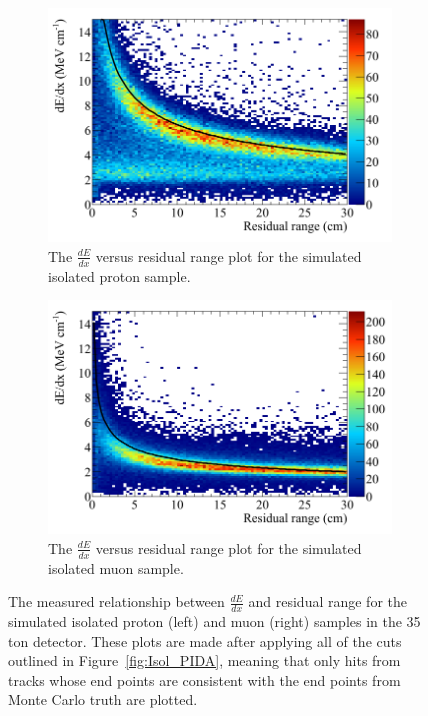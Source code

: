 \begin{figure}
  \centering
  \begin{subfigure}{0.48\textwidth}
        \centering
        \includegraphics[width=\textwidth]{IsolatedProtons_500V_Dec16_Proton_dEdx}
        \caption{The $\frac{dE}{dx}$ versus residual range plot for the simulated isolated proton sample.}
        \label{fig:Isol_dEdx_Proton}
  \end{subfigure}%
  \hspace{0.03\textwidth}%
  \begin{subfigure}{0.48\textwidth}
        \centering
        \includegraphics[width=\textwidth]{IsolatedMuons_500V_Dec16_Muon_dEdx}
        \caption{The $\frac{dE}{dx}$ versus residual range plot for the simulated isolated muon sample.}
        \label{fig:Isol_dEdx_Muon}
  \end{subfigure}
  \caption[The $\frac{dE}{dx}$ versus residual range plot for the simulated isolated proton and muon samples in the 35 ton detector.]
          {The measured relationship between $\frac{dE}{dx}$ and residual range for the simulated isolated proton (left) and muon (right) samples in the 35 ton detector. These plots are made after applying all of the cuts outlined in Figure~\ref{fig:Isol_PIDA}, meaning that only hits from tracks whose end points are consistent with the end points from Monte Carlo truth are plotted.}
  \label{fig:Isol_dEdx}
\end{figure}

